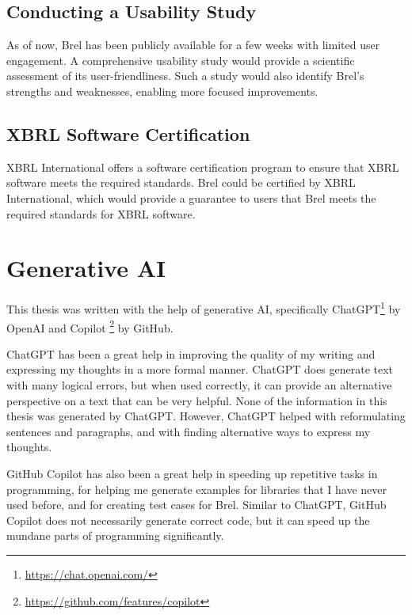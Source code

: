 \subsection{Conducting a Usability Study}

As of now, Brel has been publicly available for a few weeks with limited user engagement.
A \textcolor{airforceblue}{comprehensive usability study} would provide a scientific assessment of its user-friendliness.
Such a study would also identify Brel's strengths and weaknesses, enabling more focused improvements.

\subsection{XBRL Software Certification}

XBRL International offers a software certification program to ensure that XBRL software meets the required standards\cite{xbrl_certified_software}.
Brel could be 
\textcolor{airforceblue}{certified by XBRL International}, which would provide a guarantee to users that Brel meets the required standards for XBRL software.


\section{Generative AI}

This thesis was written with the help of generative AI, specifically ChatGPT\footnote{\url{https://chat.openai.com/}} by OpenAI and Copilot \footnote{\url{https://github.com/features/copilot}} by GitHub.

ChatGPT has been a great help in improving the quality of my writing and expressing my thoughts in a more formal manner.
ChatGPT does generate text with many logical errors, but when used correctly, it can provide an alternative perspective on a text that can be very helpful.
None of the information in this thesis was generated by ChatGPT.
However, ChatGPT helped with reformulating sentences and paragraphs, and with finding alternative ways to express my thoughts.

GitHub Copilot has also been a great help in speeding up repetitive tasks in programming,
for helping me generate examples for libraries that I have never used before,
and for creating test cases for Brel.
Similar to ChatGPT, GitHub Copilot does not necessarily generate correct code,
but it can speed up the mundane parts of programming significantly.

